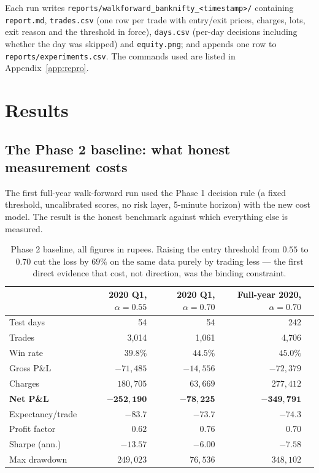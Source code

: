 \documentclass[11pt,a4paper]{article}
\newcommand{\code}[1]{\texttt{#1}}
\begin{document}
Each run writes \code{reports/walkforward\_banknifty\_<timestamp>/} containing
\code{report.md}, \code{trades.csv} (one row per trade with entry/exit prices, charges,
lots, exit reason and the threshold in force), \code{days.csv} (per-day decisions
including whether the day was skipped) and \code{equity.png}; and appends one row to
\code{reports/experiments.csv}. The commands used are listed in
Appendix~\ref{app:repro}.

\section{Results}\label{sec:results}

\subsection{The Phase 2 baseline: what honest measurement costs}

The first full-year walk-forward run used the Phase 1 decision rule (a fixed threshold,
uncalibrated scores, no risk layer, 5-minute horizon) with the new cost model. The result
is the honest benchmark against which everything else is measured.

\begin{table}[H]
\centering\small
\begin{tabular}{@{}lrrrr@{}}
\toprule
& \textbf{2020 Q1, $\alpha=0.55$} & \textbf{2020 Q1, $\alpha=0.70$}
& \textbf{Full-year 2020, $\alpha=0.70$}\\
\midrule
Test days      & 54 & 54 & 242\\
Trades         & 3{,}014 & 1{,}061 & 4{,}706\\
Win rate       & $39.8\%$ & $44.5\%$ & $45.0\%$\\
Gross P\&L     & $-71{,}485$ & $-14{,}556$ & $-72{,}379$\\
Charges        & $180{,}705$ & $63{,}669$ & $277{,}412$\\
\textbf{Net P\&L} & $\mathbf{-252{,}190}$ & $\mathbf{-78{,}225}$ & $\mathbf{-349{,}791}$\\
Expectancy/trade & $-83.7$ & $-73.7$ & $-74.3$\\
Profit factor  & $0.62$ & $0.76$ & $0.70$\\
Sharpe (ann.)  & $-13.57$ & $-6.00$ & $-7.58$\\
Max drawdown   & $249{,}023$ & $76{,}536$ & $348{,}102$\\
\bottomrule
\end{tabular}
\caption{Phase 2 baseline, all figures in rupees. Raising the entry threshold from
$0.55$ to $0.70$ cut the loss by $69\%$ on the same data purely by trading less ---
the first direct evidence that cost, not direction, was the binding constraint.}
\label{tab:baseline}
\end{table}
\end{document}
